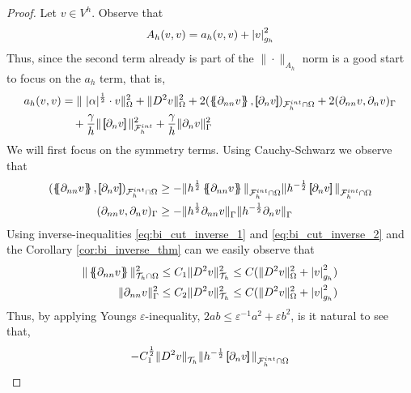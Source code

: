 \begin{proof}
    Let $v \in V^{h}$.
    Observe that \[
    A_{h}( v,v) = a_{h}( v,v)  + \left\lvert  v  \right\rvert_{g_{h}}^{2}
    \]
    Thus, since the second term already is part of the $\| \cdot  \|_{ A_{h} }^{  } $ norm is a good start to focus on the $a_{h}$ term, that is,
    \[
    \begin{split}
       a_{h}( v,v) &=   \|\ |\alpha|^{\frac{1}{2}} \cdot v  \|_{   \Omega   }^{2} + \| D^2v \|_{   \Omega  }^{2  } + 2 ( \mean{ \partial _{nn} v }, \jump{ \partial _{n} v }    )_{\mathcal{F} ^{int}_{h} \cap \Omega }  + 2 (  \partial _{nn} v ,
       \partial _{n} v  )_{\Gamma } \\
                   & \quad+ \frac{\gamma }{h}  \|  \jump{ \partial _{n} v }\|_{\mathcal{F} _{h}^{int}  }^{ 2 } + \frac{\gamma }{h}  \| \partial _{n} v \|_{ \Gamma  }^{ 2 }
    \end{split}
    \]
    We will first focus on the symmetry terms. Using Cauchy-Schwarz we observe that \[
        \begin{split}
    ( \mean{ \partial _{nn} v }  , \jump{ \partial _{n} v }  )_{\mathcal{F}^{int}_{h}\cap \Omega  } & \ge - \| h^{\frac{1}{2}}\mean{ \partial _{nn} v }   \|_{ \mathcal{F}^{int}_{h}\cap \Omega   }^{  }  \|h^{-\frac{1}{2}} \jump{ \partial _{n} v }   \|_{
    \mathcal{F}^{int}_{h}\cap \Omega   }^{  } \\
    (  \partial _{nn} v   ,  \partial _{n} v   )_{\Gamma   } & \ge - \| h^{\frac{1}{2}} \partial _{nn} v    \|_{ \Gamma    }^{  }  \|h^{-\frac{1}{2}}  \partial _{n} v    \|_{ \Gamma    }^{  }
        \end{split}
    \]
    Using inverse-inequalities \eqref{eq:bi_cut_inverse_1} and \eqref{eq:bi_cut_inverse_2} and the Corollary \ref{cor:bi_inverse_thm} can we easily observe that \[
        \begin{split}
     \| \left\{\!\!\left\{ \partial _{nn}v \right\}\!\!\right\} \|_{ \mathcal{T}_{h} \cap \Omega    }^{  2} & \le C_{1} \| D^2 v \|_{ \mathcal{T}_{h}   }^{2  } \le  C  (\| D^2 v \|_{ \Omega  }^{ 2 }  + \left\lvert  v  \right\rvert _{ g_{h} }^{2  } )  \\
     \|  \partial _{nn}v  \|_{ \Gamma     }^{ 2 } & \le C_{2} \| D^2 v \|_{ \mathcal{T} _{h}  }^{2  } \le C  (\| D^2 v \|_{ \Omega  }^{ 2 }  + \left\lvert  v  \right\rvert _{ g_{h} }^{2  } )
        \end{split}
    \]
    Thus, by applying Youngs $\varepsilon $-inequality, $2ab \le  \varepsilon^{-1} a^{2} + \varepsilon b^{2} $, is it natural to see that,
    \[
        \begin{split}
- C_{1}^{\frac{1}{2}} \| D^2 v    \|_{ \mathcal{T} _{h}   }^{  }  \|h^{-\frac{1}{2}} \jump{ \partial _{n} v }   \|_{ \mathcal{F}^{int}_{h}\cap \Omega   }^{  }

\end{split}\]
\end{proof}
